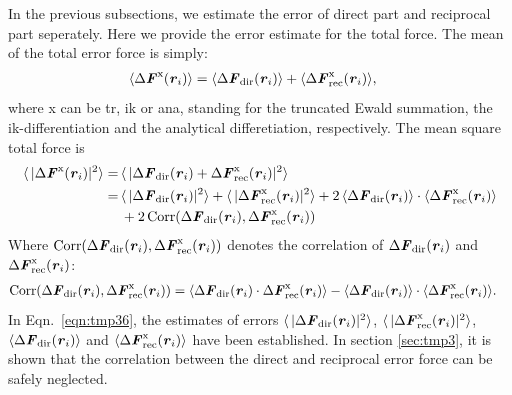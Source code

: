 \documentclass[aps,pre,preprint]{revtex4}
\renewcommand{\v}[1]{\textbf{\textit{#1}}}
\begin{document}
In the previous subsections, we estimate the error of direct part and
reciprocal part seperately. Here we provide the error estimate for the
total force. The mean of the total error force is simply:
\begin{align}
  \langle\Delta\v F^{\textrm{x}}(\v r_i) \rangle
  &=
  \langle\Delta\v F_{\textrm{dir}}(\v r_i) \rangle +
  \langle\Delta\v F^{\textrm{x}}_{\textrm{rec}}(\v r_i) \rangle,
\end{align}
where \textrm{x} can be \textrm{tr}, \textrm{ik} or \textrm{ana},
standing for the truncated Ewald summation, the ik-differentiation
and the analytical differetiation, respectively. The mean square
total force is
\begin{align}\nonumber
  \langle\,\vert\Delta\v F^{\textrm{x}}(\v r_i)\vert^2\rangle
  = \,&
  \langle\,\vert
  \Delta\v F_{\textrm{dir}}(\v r_i) + \Delta\v F^{\textrm{x}}_{\textrm{rec}}(\v r_i) 
  \vert^2 \rangle \\\nonumber
  = \,&
  \langle\,\vert\Delta\v F_{\textrm{dir}}(\v r_i)\vert^2\rangle +
  \langle\,\vert\Delta\v F^{\textrm{x}}_{\textrm{rec}}(\v r_i)\vert^2\rangle +
  2\,\langle\Delta\v F_{\textrm{dir}}(\v r_i)\rangle
  \cdot \langle\Delta\v F^{\textrm{x}}_{\textrm{rec}}(\v r_i)\rangle \\\label{eqn:tmp36}
  &
  + 2\,\textrm{Corr}(\Delta\v F_{\textrm{dir}}(\v r_i),
  \Delta\v F^{\textrm{x}}_{\textrm{rec}}(\v r_i))
\end{align}
Where $ \textrm{Corr}(\Delta\v F_{\textrm{dir}}(\v r_i), \Delta\v
F^{\textrm{x}}_{\textrm{rec}}(\v r_i))$ denotes the correlation of
$\Delta\v F_{\textrm{dir}}(\v r_i)$ and $\Delta\v
F^{\textrm{x}}_{\textrm{rec}}(\v r_i)$:
\begin{align}\label{eqn:tmp37}
  \textrm{Corr}(\Delta\v F_{\textrm{dir}}(\v r_i),
  \Delta\v F^{\textrm{x}}_{\textrm{rec}}(\v r_i))
  & =
  \langle
  \Delta\v F_{\textrm{dir}}(\v r_i)\cdot
  \Delta\v F^{\textrm{x}}_{\textrm{rec}}(\v r_i)
  \rangle -
  \langle
  \Delta\v F_{\textrm{dir}}(\v r_i)
  \rangle\cdot
  \langle
  \Delta\v F^{\textrm{x}}_{\textrm{rec}}(\v r_i)
  \rangle.
\end{align}
In Eqn.~\eqref{eqn:tmp36}, the estimates of errors
$\langle\,\vert\Delta\v F_{\textrm{dir}}(\v r_i)\vert^2\rangle $,
$\langle\,\vert\Delta\v F^{\textrm{x}}_{\textrm{rec}}(\v
r_i)\vert^2\rangle $, $\langle\Delta\v F_{\textrm{dir}}(\v
r_i)\rangle$ and $\langle\Delta\v F^{\textrm{x}}_{\textrm{rec}}(\v
r_i)\rangle $ have been established. In section \ref{sec:tmp3}, it is
shown that the correlation between the direct and reciprocal error
force can be safely neglected.
\end{document}
